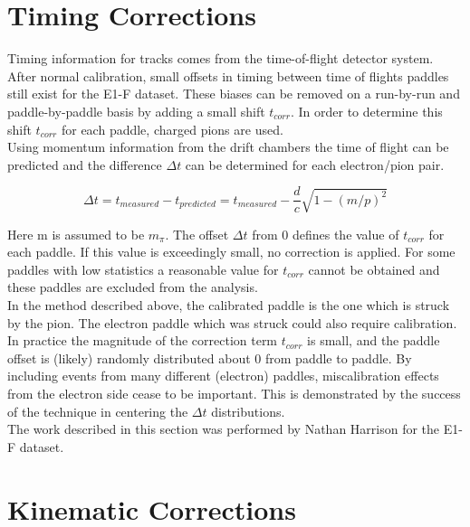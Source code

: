 \section{Timing Corrections}
Timing information for tracks comes from the time-of-flight detector system.  After normal calibration, small offsets in timing between time of flights paddles still exist for the E1-F dataset.  These biases can be removed on a run-by-run and paddle-by-paddle basis by adding a small shift $t_{corr}$.  In order to determine this shift $t_{corr}$ for each paddle, charged pions are used.  \\

Using momentum information from the drift chambers the time of flight can be predicted and the difference $\Delta t$ can be determined for each electron/pion pair. 

\begin{equation}
	\Delta t = t_{measured} - t_{predicted} = t_{measured} - \frac{d}{c} \sqrt{1-(m/p)^2} 
\end{equation} 

Here m is assumed to be $m_{\pi}$.  The offset $\Delta t$ from 0 defines the value of $t_{corr}$ for each paddle.  If this value is exceedingly small, no correction is applied.  For some paddles with low statistics a reasonable value for $t_{corr}$ cannot be obtained and these paddles are excluded from the analysis.  \\

In the method described above, the calibrated paddle is the one which is struck by the pion.  The electron paddle which was struck could also require calibration.  In practice the magnitude of the correction term $t_{corr}$ is small, and the paddle offset is (likely) randomly distributed about 0 from paddle to paddle.  By including events from many different (electron) paddles, miscalibration effects from the electron side cease to be important.  This is demonstrated by the success of the technique in centering the $\Delta t$ distributions.  \\

The work described in this section was performed by Nathan Harrison for the E1-F dataset.

\section{Kinematic Corrections}

